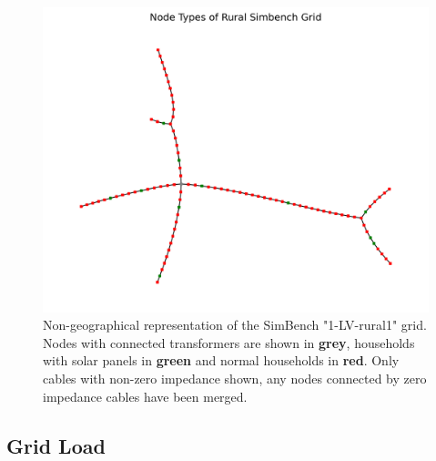 \begin{figure}[H]
    \includegraphics{img/simbench/layout.png}
    \caption{
        Non-geographical representation of the SimBench "1-LV-rural1"
        grid\autocite{simbench}. Nodes with connected transformers are shown
        in \textbf{grey}, households with solar panels in \textbf{green}
        and normal households in \textbf{red}. Only cables with non-zero impedance shown, any nodes
        connected by zero impedance cables have been merged.
    }
    \label{fig:vep:simbench_node_types}
\end{figure}



\subsection{Grid Load}

